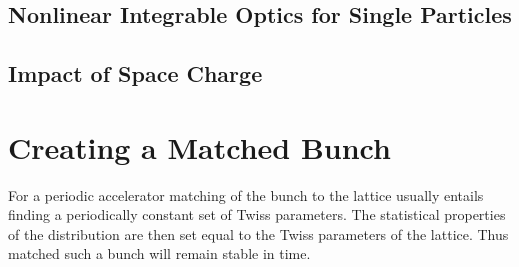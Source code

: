 \documentclass[aps,prstab,twocolumn, groupedaddress]{revtex4-1}
\begin{document}




\subsection{Nonlinear Integrable Optics for Single Particles}
\subsection{Impact of Space Charge}

\section{Creating a Matched Bunch}
For a periodic accelerator matching of the bunch to the lattice usually entails finding a 
periodically constant set of Twiss parameters. The statistical properties of the distribution 
are then set equal to the Twiss parameters of the lattice. Thus matched such a bunch will 
remain stable in time.
\end{document}
